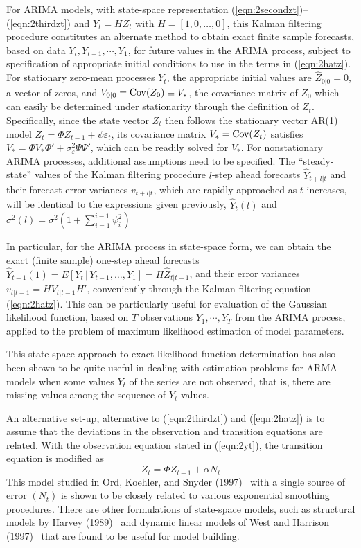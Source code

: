 For ARIMA models, with state-space representation (\ref{eqn:2secondzt})--(\ref{eqn:2thirdzt}) and $Y_t = HZ_t$ with $H = [1,0,\ldots,0]$, this Kalman filtering procedure constitutes an alternate method to obtain exact finite sample forecasts, based on data $Y_t,Y_{t-1},\cdots,Y_1$, for future values in the ARIMA process, subject to specification of appropriate initial conditions to use in the terms in (\ref{eqn:2hatz}). For stationary zero-mean processes $Y_t$, the appropriate initial values are $\hat{Z}_{0|0} = 0$, a vector of zeros, and $V_{0|0} = \operatorname{Cov}(Z_0) \equiv V_*$, the covariance matrix of $Z_0$ which can easily be determined under stationarity through the definition of $Z_t$. Specifically, since the state vector $Z_t$ then follows the stationary vector AR(1) model $Z_t = \Phi Z_{t-1} + \psi\varepsilon_t$, its covariance matrix $V_*= \operatorname{Cov}(Z_t)$ satisfies $V_*= \Phi V_*\Phi' + \sigma_{\varepsilon}^2\Psi\Psi'$, which can be readily solved for $V_*$. For nonstationary ARIMA processes, additional assumptions need to be specified. The ``steady-state'' values of the Kalman filtering procedure $l$-step ahead forecasts $\hat{Y}_{t+l|t}$ and their forecast error variances $v_{t+l|t}$, which are rapidly approached as $t$ increases, will be identical to the expressions given previously, $\hat{Y}_t(l)$ and $\sigma^2(l) = \sigma^2(1 + \sum_{i=1}^{i-1}\psi_{i}^2)$


In particular, for the ARIMA process in state-space form, we can obtain the exact (finite sample) one-step ahead forecasts $\hat{Y}_{t-1}(1) = E[Y_t\,|\,Y_{t-1},\ldots,Y_1] = H \hat{Z}_{t|t-1}$, and their error variances $v_{t|t-1} = H V_{t|t-1} H'$, conveniently through the Kalman filtering equation (\ref{eqn:2hatz}). This can be particularly useful for evaluation of the Gaussian likelihood function, based on $T$ observations $Y_1,\cdots,Y_T$ from the ARIMA process, applied to the problem of maximum likelihood estimation of model parameters.

This state-space approach to exact likelihood function determination has also been shown to be quite useful in dealing with estimation problems for ARMA models when some values $Y_t$ of the series are not observed, that is, there are missing values among the sequence of $Y_t$ values.

An alternative set-up, alternative to (\ref{eqn:2thirdzt}) and (\ref{eqn:2hatz}) is to assume that the deviations in the observation and transition equations are related. With the observation equation stated in (\ref{eqn:2yt}), the transition equation is modified as 
	\begin{equation}\label{eqn:223zt}
	Z_t = \Phi Z_{t-1} + \alpha N_t 
	\end{equation}
This model studied in Ord, Koehler, and Snyder (1997)~\cite{ord1997estimation} with a single source of error $(N_t)$ is shown to be closely related to various exponential smoothing procedures. There are other formulations of state-space models, such as structural models by Harvey (1989)~\cite{harvey1989kalman} and dynamic linear models of West and Harrison (1997)~\cite{west1997} that are found to be useful for model building.


